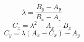 \[ \lambda = \frac{B_y - A_y} {B_x - A_x} \]
\[ C_x = \lambda^2 - A_x - B_x \]
\[ C_y = \lambda(A_x - C_x) - A_y \]
